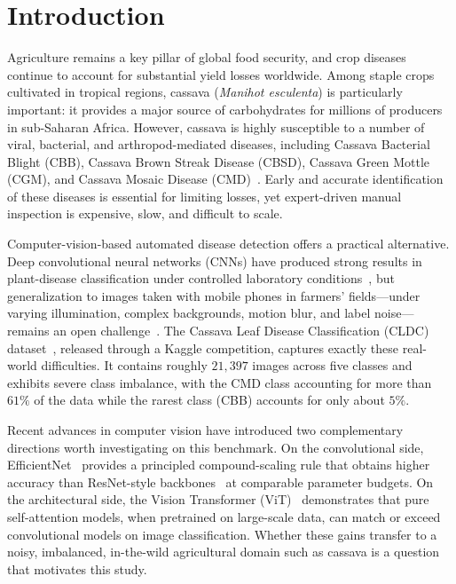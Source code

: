 \documentclass[conference]{IEEEtran}
\begin{document}
\section{Introduction}
\label{sec:intro}

Agriculture remains a key pillar of global food security, and crop diseases continue to account for substantial yield losses worldwide. Among staple crops cultivated in tropical regions, cassava (\emph{Manihot esculenta}) is particularly important: it provides a major source of carbohydrates for millions of producers in sub-Saharan Africa. However, cassava is highly susceptible to a number of viral, bacterial, and arthropod-mediated diseases, including Cassava Bacterial Blight (CBB), Cassava Brown Streak Disease (CBSD), Cassava Green Mottle (CGM), and Cassava Mosaic Disease (CMD)~\cite{mwebaze2020cassava}. Early and accurate identification of these diseases is essential for limiting losses, yet expert-driven manual inspection is expensive, slow, and difficult to scale.

Computer-vision-based automated disease detection offers a practical alternative. Deep convolutional neural networks (CNNs) have produced strong results in plant-disease classification under controlled laboratory conditions~\cite{mohanty2016plantdisease,ferentinos2018}, but generalization to images taken with mobile phones in farmers' fields---under varying illumination, complex backgrounds, motion blur, and label noise---remains an open challenge~\cite{barbedo2018}. The Cassava Leaf Disease Classification (CLDC) dataset~\cite{mwebaze2020cassava}, released through a Kaggle competition, captures exactly these real-world difficulties. It contains roughly $21{,}397$ images across five classes and exhibits severe class imbalance, with the CMD class accounting for more than $61\%$ of the data while the rarest class (CBB) accounts for only about $5\%$.

Recent advances in computer vision have introduced two complementary directions worth investigating on this benchmark. On the convolutional side, EfficientNet~\cite{tan2019efficientnet} provides a principled compound-scaling rule that obtains higher accuracy than ResNet-style backbones~\cite{he2016resnet} at comparable parameter budgets. On the architectural side, the Vision Transformer (ViT)~\cite{dosovitskiy2021vit} demonstrates that pure self-attention models, when pretrained on large-scale data, can match or exceed convolutional models on image classification. Whether these gains transfer to a noisy, imbalanced, in-the-wild agricultural domain such as cassava is a question that motivates this study.
\end{document}
